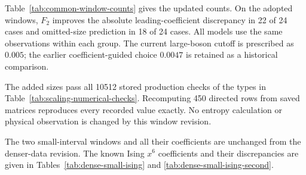 Table~\ref{tab:common-window-counts} gives the updated counts. On the adopted windows, $F_2$ improves the absolute leading-coefficient discrepancy in 22 of 24 cases and omitted-size prediction in 18 of 24 cases. All models use the same observations within each group. The current large-boson cutoff is prescribed as $0.005$; the earlier coefficient-guided choice $0.0047$ is retained as a historical comparison.

The added sizes pass all 10512 stored production checks of the types in Table~\ref{tab:scaling-numerical-checks}. Recomputing 450 directed rows from saved matrices reproduces every recorded value exactly. No entropy calculation or physical observation is changed by this window revision.

The two small-interval windows and all their coefficients are unchanged from the denser-data revision. The known Ising $x^6$ coefficients and their discrepancies are given in Tables~\ref{tab:dense-small-ising} and \ref{tab:dense-small-ising-second}.

